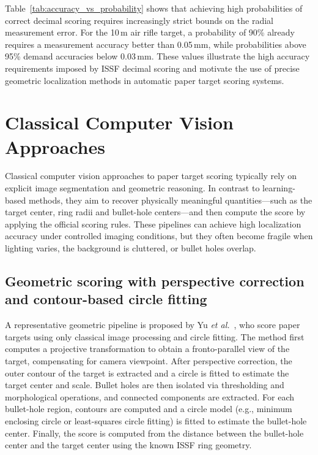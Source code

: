 Table~\ref{tab:accuracy_vs_probability} shows that achieving high probabilities of correct
decimal scoring requires increasingly strict bounds on the radial measurement error.
For the 10\,m air rifle target, a probability of 90\% already requires a measurement
accuracy better than 0.05\,mm, while probabilities above 95\% demand accuracies below
0.03\,mm. These values illustrate the high accuracy requirements imposed by ISSF
decimal scoring and motivate the use of precise geometric localization methods in
automatic paper target scoring systems.

\section{Classical Computer Vision Approaches}
\label{sec:classical_methods}

Classical computer vision approaches to paper target scoring typically rely on explicit image
segmentation and geometric reasoning. In contrast to learning-based methods, they aim to
recover physically meaningful quantities---such as the target center, ring radii and bullet-hole
centers---and then compute the score by applying the official scoring rules. These pipelines can
achieve high localization accuracy under controlled imaging conditions, but they often become
fragile when lighting varies, the background is cluttered, or bullet holes overlap.

\subsection{Geometric scoring with perspective correction and contour-based circle fitting}
A representative geometric pipeline is proposed by Yu \textit{et al.}~\cite{yu2023_contourcircle},
who score paper targets using only classical image processing and circle fitting. The method first
computes a projective transformation to obtain a fronto-parallel view of the target, compensating
for camera viewpoint. After perspective correction, the outer contour of the target is extracted and
a circle is fitted to estimate the target center and scale. Bullet holes are then isolated via
thresholding and morphological operations, and connected components are extracted. For each
bullet-hole region, contours are computed and a circle model (e.g., minimum enclosing circle or
least-squares circle fitting) is fitted to estimate the bullet-hole center. Finally, the score is computed
from the distance between the bullet-hole center and the target center using the known ISSF ring
geometry.

